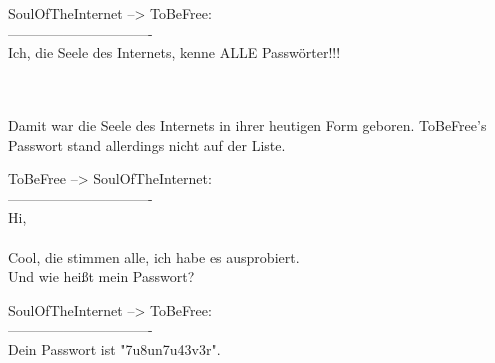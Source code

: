 \noindent \parbox{\textwidth}{

    \begin{footnotesize}
    \begin{itshape}

\noindent SoulOfTheInternet --> ToBeFree:\\
\noindent -------------------------------\\
\noindent Ich, die Seele des Internets, kenne ALLE Passwörter!!!\\
\noindent ~\\
\\

    \end{itshape}
    \end{footnotesize}

}

Damit war die Seele des Internets in ihrer heutigen Form geboren. ToBeFree's Passwort stand allerdings nicht auf der Liste.

\noindent \parbox{\textwidth}{

    \begin{footnotesize}
    \begin{itshape}
    \begin{flushright}

\noindent ToBeFree --> SoulOfTheInternet:\\
\noindent -------------------------------\\
\noindent Hi,\\
\noindent ~\\
\noindent Cool, die stimmen alle, ich habe es ausprobiert.\\
\noindent Und wie heißt mein Passwort?\\

    \end{flushright}
    \end{itshape}
    \end{footnotesize}

}


\noindent \parbox{\textwidth}{

    \begin{footnotesize}
    \begin{itshape}

\noindent SoulOfTheInternet --> ToBeFree:\\
\noindent -------------------------------\\
\noindent Dein Passwort ist "7u8un7u43v3r".\\

    \end{itshape}
    \end{footnotesize}

}

